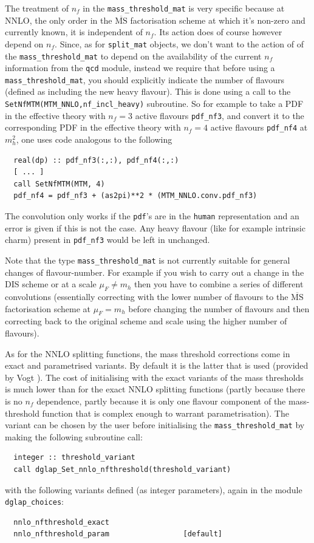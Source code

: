 \documentclass[12pt]{article}
\newcommand{\MSbar}{\overline{\mathrm{MS}}}
\newcommand{\ttt}[1]{\texttt{#1}}
\begin{document}
The treatment of $n_f$ in the \ttt{mass\_threshold\_mat} is very
specific because at NNLO, the only order in the $\MSbar$ factorisation
scheme at which it's non-zero and currently known, it is independent of $n_f$.
Its action does of course however depend on $n_f$. Since, as for
\ttt{split\_mat} objects, we don't want to the action of of the
\ttt{mass\_threshold\_mat} to depend on the availability of the
current $n_f$ information from the \ttt{qcd} module, instead we
require that before using a \ttt{mass\_threshold\_mat}, you should
explicitly indicate the number of flavours (defined as including the
new heavy flavour). This is done using a call to the
\ttt{SetNfMTM(MTM\_NNLO,nf\_incl\_heavy)} subroutine. So for example
to take a PDF in the effective theory with
$n_f=3$ active flavours \ttt{pdf\_nf3}, and convert it
to the corresponding PDF in the effective theory with
$n_f=4$ active flavours \ttt{pdf\_nf4} at $m_h^2$, one
uses code analogous to the following
\begin{lstlisting}
  real(dp) :: pdf_nf3(:,:), pdf_nf4(:,:)
  [ ... ]
  call SetNfMTM(MTM, 4)
  pdf_nf4 = pdf_nf3 + (as2pi)**2 * (MTM_NNLO.conv.pdf_nf3)
\end{lstlisting}
The convolution only works if the \ttt{pdf}'s are in the \ttt{human}
representation and an error is given if this is not the case. Any
heavy flavour (like for example intrinsic charm) 
present in \ttt{pdf\_nf3} would be left in unchanged.

Note that the type {\tt mass\_threshold\_mat}
is not currently suitable for general changes of
flavour-number. For example if you wish to carry out a change in the
DIS scheme or at a scale $\mu_F \neq m_h$ then you have
to combine a series of different convolutions (essentially correcting
with the lower number of flavours to the $\MSbar$ factorisation scheme
at $\mu_F = m_h$ before changing the number of flavours
and then correcting back to the original scheme and scale using the
higher number of flavours).


As for the NNLO splitting functions, the mass threshold corrections
come in exact and parametrised variants. By default it is the latter
that is used (provided by Vogt \cite{VogtMTMParam}).  The cost of
initialising with the exact variants of the mass thresholds is much
lower than for the exact NNLO splitting functions (partly because
there is no $n_f$ dependence, partly because it is only one flavour
component of the mass-threshold function that is complex enough to
warrant parametrisation). The variant can be chosen by the user
before initialising the \ttt{mass\_threshold\_mat} by making the
following subroutine call:
\begin{lstlisting}
  integer :: threshold_variant
  call dglap_Set_nnlo_nfthreshold(threshold_variant)
\end{lstlisting}
with the following variants defined (as integer parameters), again in
the module \ttt{dglap\_choices}:
\begin{lstlisting}
  nnlo_nfthreshold_exact
  nnlo_nfthreshold_param                 [default]
\end{lstlisting}
\end{document}
